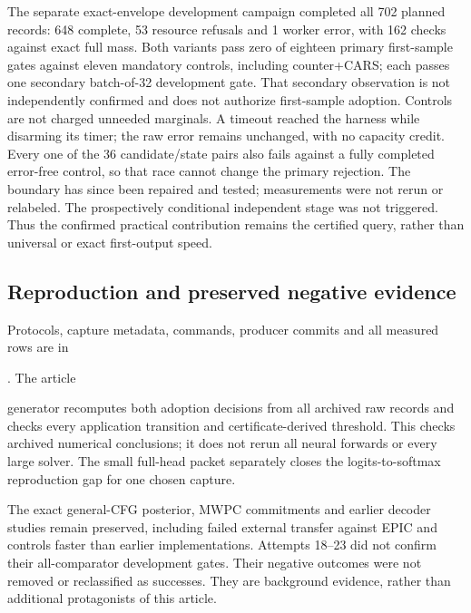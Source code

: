 The separate exact-envelope development campaign completed all 702 planned records: 648 complete, 53 resource refusals and 1 worker error, with 162 checks against exact full mass. Both variants pass zero of eighteen primary first-sample gates against eleven mandatory controls, including counter+CARS; each passes one secondary batch-of-32 development gate. That secondary observation is not independently confirmed and does not authorize first-sample adoption. Controls are not charged unneeded marginals. A timeout reached the harness while disarming its timer; the raw error remains unchanged, with no capacity credit. Every one of the 36 candidate/state pairs also fails against a fully completed error-free control, so that race cannot change the primary rejection. The boundary has since been repaired and tested; measurements were not rerun or relabeled. The prospectively conditional independent stage was not triggered. Thus the confirmed practical contribution remains the certified query, rather than universal or exact first-output speed.



\subsection{Reproduction and preserved negative evidence}

Protocols, capture metadata, commands, producer commits and all measured rows are in

. The article

generator recomputes both adoption decisions from all archived raw records and checks every application transition and certificate-derived threshold. This checks archived numerical conclusions; it does not rerun all neural forwards or every large solver. The small full-head packet separately closes the logits-to-softmax reproduction gap for one chosen capture.

The exact general-CFG posterior, MWPC commitments and earlier decoder studies remain preserved, including failed external transfer against EPIC and controls faster than earlier implementations. Attempts 18--23 did not confirm their all-comparator development gates. Their negative outcomes were not removed or reclassified as successes. They are background evidence, rather than additional protagonists of this article.

